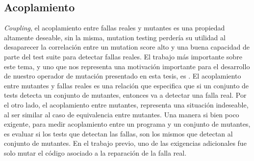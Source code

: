 \subsection{Acoplamiento}

\emph{Coupling}, el acoplamiento entre fallas reales y mutantes es una propiedad altamente deseable, sin la misma, mutation testing perder\'ia su utilidad al desaparecer la correlaci\'on entre un mutation score alto y una buena capacidad de parte del test suite para detectar fallas reales. El trabajo m\'as importante sobre este tema, y uno que nos representa una motivaci\'on importante para el desarrollo de nuestro operador de mutaci\'on presentado en esta tesis, es \cite{bibliography.mutation.evaluation.valid-substitute}. El acoplamiento entre mutantes y fallas reales es una relaci\'on que especifica que si un conjunto de tests detecta un conjunto de mutantes, entonces va a detectar una falla real. Por el otro lado, el acoplamiento entre mutantes, representa una situaci\'on indeseable, al ser similar al caso de equivalencia entre mutantes. Una manera si bien poco exigente, para medir acoplamiento entre un programa y un conjunto de mutantes, es evaluar si los tests que detectan las fallas, son los mismos que detectan al conjunto de mutantes. En el trabajo previo, uno de las exigencias adicionales fue solo mutar el c\'odigo asociado a la reparaci\'on de la falla real.

%
